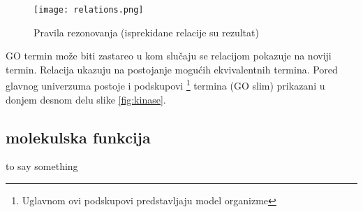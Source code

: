 \begin{figure}[h!]
  \centering
  \texttt{[image: relations.png]}
  \caption{Pravila rezonovanja (isprekidane relacije su rezultat)}
  \label{fig:relations}
\end{figure}

GO termin može biti zastareo u kom slučaju se relacijom 
pokazuje na noviji termin. Relacija  ukazuju na
postojanje mogućih ekvivalentnih termina. Pored glavnog univerzuma postoje i
podskupovi \footnote{Uglavnom ovi podskupovi predstavljaju model organizme}
termina (GO slim) prikazani u donjem desnom delu slike \ref{fig:kinase}.


\subsection{molekulska funkcija}
to say something \parencite{go_mf}




















